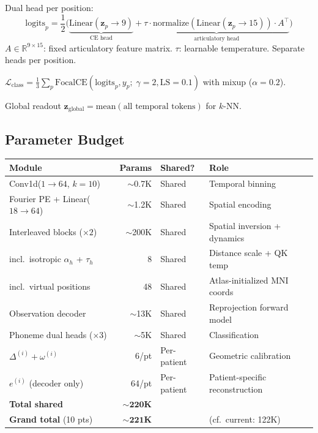 \documentclass[11pt,letterpaper]{article}
\newcommand{\bfz}{\mathbf{z}}
\newcommand{\R}{\mathbb{R}}
\begin{document}
Dual head per position:
\begin{equation}
\text{logits}_p = \frac{1}{2}\bigl(\underbrace{\text{Linear}(\bfz_p \to 9)}_{\text{CE head}} + \underbrace{\tau \cdot \text{normalize}(\text{Linear}(\bfz_p \to 15)) \cdot A^\top}_{\text{articulatory head}}\bigr)
\end{equation}
$A \in \R^{9 \times 15}$: fixed articulatory feature matrix. $\tau$: learnable temperature. Separate heads per position.

$\mathcal{L}_{\text{class}} = \frac{1}{3}\sum_{p} \text{FocalCE}(\text{logits}_p, y_p;\; \gamma{=}2, \text{LS}{=}0.1)$ with mixup ($\alpha{=}0.2$).

Global readout $\bfz_{\text{global}} = \text{mean}(\text{all temporal tokens})$ for $k$-NN.


\subsection{Parameter Budget}

\begin{table}[ht!]\centering\small
\begin{tabular}{@{}lrll@{}}
\toprule
\textbf{Module} & \textbf{Params} & \textbf{Shared?} & \textbf{Role} \\
\midrule
Conv1d($1 \to 64$, $k{=}10$) & ${\sim}$0.7K & Shared & Temporal binning \\
Fourier PE + Linear($18 \to 64$) & ${\sim}$1.2K & Shared & Spatial encoding \\
Interleaved blocks ($\times 2$) & ${\sim}$200K & Shared & Spatial inversion + dynamics \\
\quad incl.\ isotropic $\alpha_h$ + $\tau_h$ & 8 & Shared & Distance scale + QK temp \\
\quad incl.\ virtual positions & 48 & Shared & Atlas-initialized MNI coords \\
Observation decoder & ${\sim}$13K & Shared & Reprojection forward model \\
Phoneme dual heads ($\times 3$) & ${\sim}$5K & Shared & Classification \\
\midrule
$\Delta^{(i)} + \omega^{(i)}$ & 6/pt & Per-patient & Geometric calibration \\
$e^{(i)}$ (decoder only) & 64/pt & Per-patient & Patient-specific reconstruction \\
\midrule
\textbf{Total shared} & $\mathbf{{\sim}220}$\textbf{K} & & \\
\textbf{Grand total} (10 pts) & $\mathbf{{\sim}221}$\textbf{K} & & (cf.\ current: 122K) \\
\bottomrule
\end{tabular}
\end{table}
\end{document}
